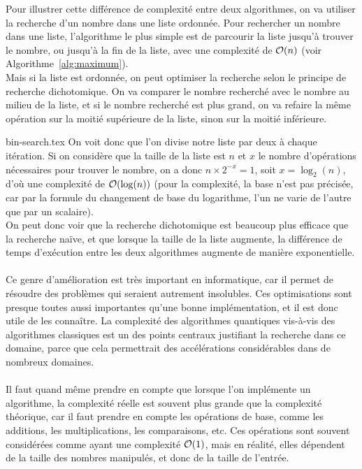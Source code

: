 Pour illustrer cette différence de complexité entre deux algorithmes, on va utiliser la recherche d'un nombre
dans une liste ordonnée.
Pour rechercher un nombre dans une liste, l'algorithme le plus simple est de parcourir la liste
jusqu'à trouver le nombre, ou jusqu'à la fin de la liste, avec une complexité de $\order{n}$
(voir Algorithme~\ref{alg:maximum}).\\
Mais si la liste est ordonnée, on peut optimiser la recherche selon le principe de recherche dichotomique.
On va comparer le nombre recherché avec le nombre au milieu de la liste, et si le nombre recherché est plus
grand, on va refaire la même opération sur la moitié supérieure de la liste, sinon sur la moitié inférieure.

{bin-search.tex}
On voit donc que l'on divise notre liste par deux à chaque itération.
Si on considère que la taille de la liste est $n$ et $x$ le nombre d'opérations nécessaires pour trouver le
nombre, on a donc $n \times 2^{-x} = 1$, soit $x = \log_2(n)$, d'où une complexité de $\order{\log(n)}$
(pour la complexité, la base n'est pas précisée, car par la formule du changement de base du
logarithme, l'un ne varie de l'autre que par un scalaire).\\
On peut donc voir que la recherche dichotomique est beaucoup plus efficace que la recherche naïve, et que
lorsque la taille de la liste augmente, la différence de temps d'exécution entre les deux algorithmes
augmente de manière exponentielle.\\ \\
Ce genre d'amélioration est très important en informatique, car il permet de résoudre des problèmes
qui seraient autrement insolubles.
Ces optimisations sont presque toutes aussi importantes qu'une bonne implémentation, et il est donc
utile de les connaître.
La complexité des algorithmes quantiques vis-à-vis des algorithmes classiques est un des points
centraux justifiant la recherche dans ce domaine, parce que cela permettrait des accélérations
considérables dans de nombreux domaines.\\ \\
Il faut quand même prendre en compte que lorsque l'on implémente un algorithme, la complexité
réelle est souvent plus grande que la complexité théorique, car il faut prendre en compte
les opérations de base, comme les additions, les multiplications, les comparaisons, etc.
Ces opérations sont souvent considérées comme ayant une complexité $\order{1}$, mais en réalité, elles
dépendent de la taille des nombres manipulés, et donc de la taille de l'entrée.\\
